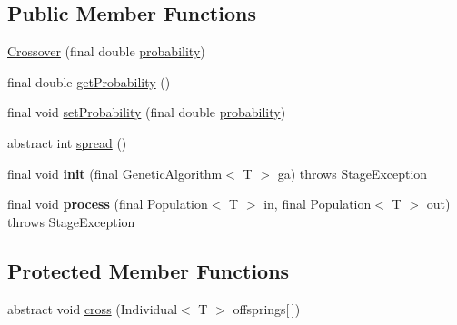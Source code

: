 \subsection*{Public Member Functions}
\begin{DoxyCompactItemize}
\item 
\hyperlink{classjenes_1_1stage_1_1operator_1_1_crossover_3_01_t_01extends_01_chromosome_01_4_a2287f5646b08b9c3167934ee620f2d6e}{Crossover} (final double \hyperlink{classjenes_1_1stage_1_1operator_1_1_crossover_3_01_t_01extends_01_chromosome_01_4_a2b4aec7312a223ba84862f7848b14542}{probability})
\item 
final double \hyperlink{classjenes_1_1stage_1_1operator_1_1_crossover_3_01_t_01extends_01_chromosome_01_4_a86b60220061c4bf1f0eaae66d22f5eb8}{get\-Probability} ()
\item 
final void \hyperlink{classjenes_1_1stage_1_1operator_1_1_crossover_3_01_t_01extends_01_chromosome_01_4_ac491f1c3b3b8c074f3b59bc33f65f389}{set\-Probability} (final double \hyperlink{classjenes_1_1stage_1_1operator_1_1_crossover_3_01_t_01extends_01_chromosome_01_4_a2b4aec7312a223ba84862f7848b14542}{probability})
\item 
abstract int \hyperlink{classjenes_1_1stage_1_1operator_1_1_crossover_3_01_t_01extends_01_chromosome_01_4_a8bb995f2cf77073b79c9276ee3e8535d}{spread} ()
\item 
\hypertarget{classjenes_1_1stage_1_1operator_1_1_crossover_3_01_t_01extends_01_chromosome_01_4_ac0b5d0219d2938f7756e616d04039ae0}{final void {\bfseries init} (final Genetic\-Algorithm$<$ T $>$ ga)  throws Stage\-Exception }\label{classjenes_1_1stage_1_1operator_1_1_crossover_3_01_t_01extends_01_chromosome_01_4_ac0b5d0219d2938f7756e616d04039ae0}

\item 
\hypertarget{classjenes_1_1stage_1_1operator_1_1_crossover_3_01_t_01extends_01_chromosome_01_4_ac14c88e86762023813c69bee4c31d7ea}{final void {\bfseries process} (final Population$<$ T $>$ in, final Population$<$ T $>$ out)  throws Stage\-Exception }\label{classjenes_1_1stage_1_1operator_1_1_crossover_3_01_t_01extends_01_chromosome_01_4_ac14c88e86762023813c69bee4c31d7ea}

\end{DoxyCompactItemize}
\subsection*{Protected Member Functions}
\begin{DoxyCompactItemize}
\item 
abstract void \hyperlink{classjenes_1_1stage_1_1operator_1_1_crossover_3_01_t_01extends_01_chromosome_01_4_ac47e22fb5a73617bde7a1131da5be161}{cross} (Individual$<$ T $>$ offsprings\mbox{[}$\,$\mbox{]})
\end{DoxyCompactItemize}
